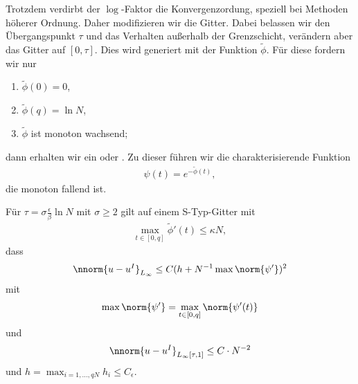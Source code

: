 Trotzdem verdirbt der $\log$-Faktor die Konvergenzordung, speziell bei Methoden höherer Ordnung. Daher modifizieren wir die Gitter. Dabei belassen wir den Übergangspunkt $\tau$ und das Verhalten außerhalb der Grenzschicht, verändern aber das Gitter auf $[0, \tau]$. Dies wird generiert mit der Funktion $\tilde\phi$. Für diese fordern wir nur
\begin{enumerate}
\item $\tilde \phi (0) = 0$, 
\item $\tilde \phi (q) = \ln N$, 
\item $\tilde \phi$ ist monoton wachsend;
\end{enumerate}
dann erhalten wir ein  oder . 
Zu dieser führen wir die charakterisierende Funktion
\begin{align*}
  \psi(t) = e^{- \tilde \phi (t)}, 
\end{align*}
die monoton fallend ist. 
\begin{folgerung}\label{6-13}
  Für $\tau = \sigma \frac \epsilon \beta \ln N$ mit $\sigma \geq 2$ gilt auf einem S-Typ-Gitter mit
  \begin{align*}
    \max_{t \in [0, q]} \tilde \phi'(t) \leq \kappa N,
  \end{align*}
  dass
  \begin{align*}
    \nnorm{u - u^{I}}_{L_{\infty}} \leq C ( h + N^{-1} \max \norm{\psi'})^{2}  
  \end{align*}
  mit
  \begin{align*}
    \max \norm{\psi'} =   \max_{t \in [0, q]} \norm{\psi'(t)} 
  \end{align*}
  und
  \begin{align*}
    \nnorm{u - u^{I}}_{L_{\infty}[\tau, 1]} \leq C \cdot N^{-2}
  \end{align*}
  und $h = \max_{i = 1, \dots, q N} h_{i} \leq C_{\epsilon}$.  
\end{folgerung}
